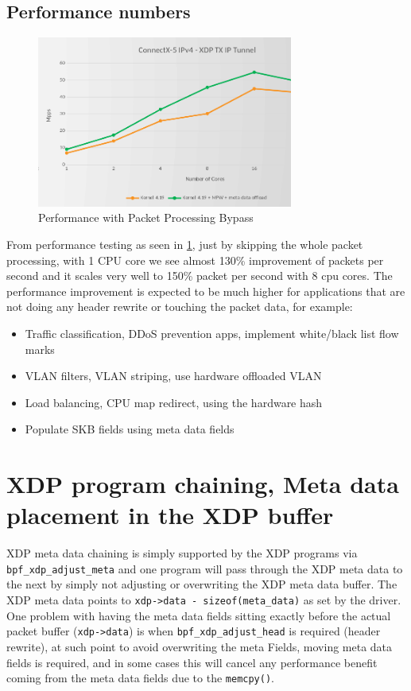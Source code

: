 \documentclass[letterpaper]{article}
\begin{document}
\subsection{Performance numbers}

\begin{figure}[h]
\includegraphics[width=3.31in]{mlx-xdp-perf.png}
\caption{Performance with Packet Processing Bypass}
\label{mlx-xdp-perf}
\end{figure}

From performance testing as seen in \ref{mlx-xdp-perf}, just by skipping the whole packet processing, with 1 CPU core we see almost 130\% improvement of packets per second and it scales very well to 150\% packet per second with 8 cpu cores.
\newline
\newline
The performance improvement is expected to be much higher for applications that are not doing any header rewrite or touching the packet data, for example:

\begin{itemize}
	\item Traffic classification, DDoS prevention apps, implement white/black list flow marks
	\item VLAN filters, VLAN striping, use hardware offloaded VLAN
	\item Load balancing, CPU map redirect, using the hardware hash
	\item Populate SKB fields using meta data fields
\end{itemize}

\section{XDP program chaining, Meta data placement in the XDP buffer}

XDP meta data chaining is simply supported by the XDP programs via \small{\texttt{bpf\_xdp\_adjust\_meta}} and one program will pass through the XDP meta data to the next by simply not adjusting or overwriting the XDP meta data buffer.
\newline
\newline
The XDP meta data points to \small{\texttt{xdp->data - sizeof(meta\_data)}} as set by the driver. One problem with having the meta data fields sitting exactly before the actual packet buffer (\small{\texttt{xdp->data}}) is when \small{\texttt{bpf\_xdp\_adjust\_head}} is required (header rewrite), at such point to avoid overwriting the meta Fields, moving meta data fields is required, and in some cases this will cancel any performance benefit coming from the meta data fields due to the \small{\texttt{memcpy()}}.
\end{document}
